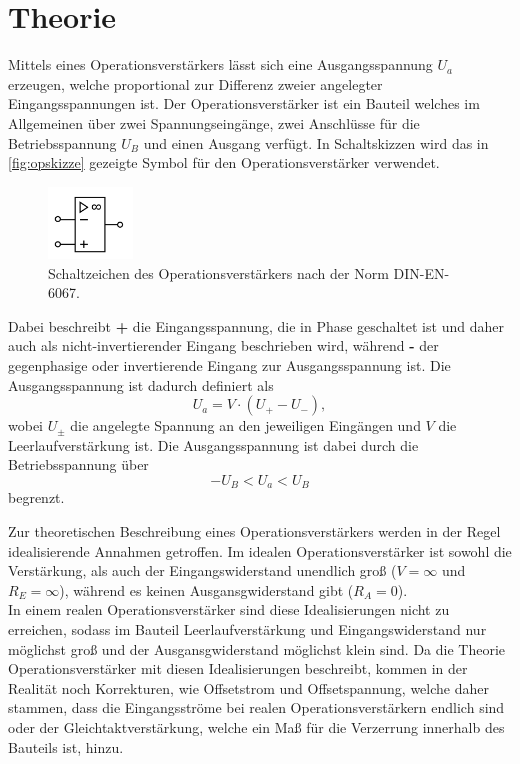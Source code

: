 \section{Theorie}
\label{sec:theorie}
Mittels eines Operationsverstärkers lässt sich eine Ausgangsspannung $U_a$ erzeugen, welche
proportional zur Differenz zweier angelegter Eingangsspannungen ist.
Der Operationsverstärker ist ein Bauteil welches im Allgemeinen über zwei Spannungseingänge, zwei Anschlüsse
für die Betriebsspannung $U_B$ und einen Ausgang
verfügt. In Schaltskizzen wird
das in \autoref{fig:opskizze} gezeigte Symbol für den Operationsverstärker verwendet.
\begin{figure}[H]
    \centering
    \includegraphics[width=0.2\textwidth]{op.png}
    \caption{Schaltzeichen des Operationsverstärkers \cite{anleitung} nach der Norm DIN-EN-6067.}
    \label{fig:opskizze}
\end{figure}
Dabei beschreibt
\textbf{+} die Eingangsspannung, die in Phase geschaltet ist und daher auch als nicht-invertierender
Eingang beschrieben wird, während \textbf{-} der gegenphasige oder invertierende Eingang
zur Ausgangsspannung ist. Die Ausgangsspannung ist dadurch definiert als
\begin{equation*}
    U_a = V \cdot  (U_+ - U_-),
\end{equation*}
wobei $U_{\pm}$ die angelegte Spannung an den jeweiligen Eingängen und $V$ die Leerlaufverstärkung ist.
Die Ausgangsspannung ist dabei durch die Betriebsspannung über
\begin{equation*}
    - U_B < U_a < U_B
\end{equation*}
begrenzt.

Zur theoretischen Beschreibung eines Operationsverstärkers werden in der Regel idealisierende
Annahmen getroffen. Im idealen Operationsverstärker ist sowohl die Verstärkung, als auch
der Eingangswiderstand unendlich groß ($V = \infty$ und $R_E = \infty$),
während es keinen Ausgansgwiderstand gibt ($R_A = 0$). \\
In einem realen Operationsverstärker sind diese Idealisierungen nicht zu erreichen, sodass im Bauteil
Leerlaufverstärkung und Eingangswiderstand nur möglichst groß und der Ausgansgwiderstand möglichst
klein sind. Da die Theorie Operationsverstärker mit diesen Idealisierungen beschreibt,
kommen in der Realität noch Korrekturen, wie Offsetstrom und Offsetspannung, welche
daher stammen, dass die Eingangsströme bei realen Operationsverstärkern endlich sind oder
der Gleichtaktverstärkung, welche ein Maß für die Verzerrung innerhalb des Bauteils ist, hinzu.

